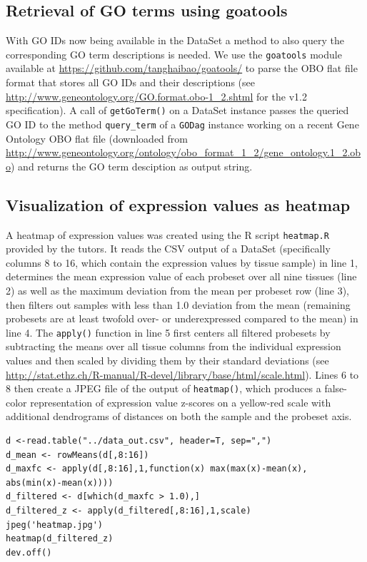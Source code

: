   \subsection[GO terms]{Retrieval of GO terms using goatools}
  
  With GO IDs now being available in the DataSet a method to also query the
corresponding GO term descriptions is needed. We use the \lstinline|goatools|
module available at \url{https://github.com/tanghaibao/goatools/} to parse the
OBO flat file format that stores all GO IDs and their descriptions (see
\url{http://www.geneontology.org/GO.format.obo-1_2.shtml} for the v1.2
specification). A call of \lstinline|getGoTerm()| on a DataSet instance passes
the queried GO ID to the method \lstinline|query_term| of a \lstinline|GODag|
instance working on a recent Gene Ontology OBO flat file (downloaded from
\url{http://www.geneontology.org/ontology/obo_format_1_2/gene_ontology.1_2.obo})
and returns the GO term desciption as output string.

  \subsection[Heatmap]{Visualization of expression values as heatmap}
  
  A heatmap of expression values was created using the R script
\lstinline|heatmap.R| provided by the tutors. It reads the CSV output of a
DataSet (specifically columns 8 to 16, which contain the expression values by
tissue sample) in line 1, determines the mean expression value of each probeset
over all nine tissues (line 2) as well as the maximum deviation from the mean
per probeset row (line 3), then filters out samples with less than 1.0 deviation
from the mean (remaining probesets are at least twofold over- or underexpressed
compared to the mean) in line 4. The \lstinline|apply()| function in line 5
first centers all filtered probesets by subtracting the means over all tissue
columns from the individual expression values and then scaled by dividing them
by their standard deviations (see
\url{http://stat.ethz.ch/R-manual/R-devel/library/base/html/scale.html}). Lines
6 to 8 then create a JPEG file of the output of \lstinline|heatmap()|, which
produces a false-color representation of expression value z-scores on a
yellow-red scale with additional dendrograms of distances on both the sample and
the probeset axis.

\lstset{language=R}
\begin{lstlisting}  
d <-read.table("../data_out.csv", header=T, sep=",")
d_mean <- rowMeans(d[,8:16])
d_maxfc <- apply(d[,8:16],1,function(x) max(max(x)-mean(x), abs(min(x)-mean(x))))
d_filtered <- d[which(d_maxfc > 1.0),]
d_filtered_z <- apply(d_filtered[,8:16],1,scale)
jpeg('heatmap.jpg')
heatmap(d_filtered_z)
dev.off()
\end{lstlisting}
  
